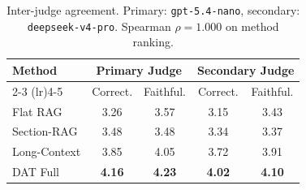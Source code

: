 \begin{table}[t]
\centering
\caption{Inter-judge agreement. Primary: \texttt{gpt-5.4-nano}, secondary:
 \texttt{deepseek-v4-pro}. Spearman $\rho = 1.000$ on method ranking.}
\label{tab:inter_judge}
\begin{tabular}{lcccc}
\toprule
\textbf{Method} & \multicolumn{2}{c}{\textbf{Primary Judge}} & \multicolumn{2}{c}{\textbf{Secondary Judge}} \\
\cmidrule(lr){2-3} \cmidrule(lr){4-5}
 & Correct. & Faithful. & Correct. & Faithful. \\
\midrule
Flat RAG & 3.26 & 3.57 & 3.15 & 3.43 \\
Section-RAG & 3.48 & 3.48 & 3.34 & 3.37 \\
Long-Context & 3.85 & 4.05 & 3.72 & 3.91 \\
DAT Full & \textbf{4.16} & \textbf{4.23} & \textbf{4.02} & \textbf{4.10} \\
\bottomrule
\end{tabular}
\end{table}
